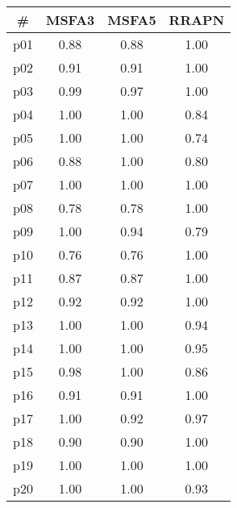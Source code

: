 \begin{tabular}{cccc}
\toprule
\textbf{\#} & \textbf{MSFA3} & \textbf{MSFA5} & \textbf{RRAPN}\\
\midrule
p01 & 0.88 & 0.88 & 1.00\\
p02 & 0.91 & 0.91 & 1.00\\
p03 & 0.99 & 0.97 & 1.00\\
p04 & 1.00 & 1.00 & 0.84\\
p05 & 1.00 & 1.00 & 0.74\\
p06 & 0.88 & 1.00 & 0.80\\
p07 & 1.00 & 1.00 & 1.00\\
p08 & 0.78 & 0.78 & 1.00\\
p09 & 1.00 & 0.94 & 0.79\\
p10 & 0.76 & 0.76 & 1.00\\
p11 & 0.87 & 0.87 & 1.00\\
p12 & 0.92 & 0.92 & 1.00\\
p13 & 1.00 & 1.00 & 0.94\\
p14 & 1.00 & 1.00 & 0.95\\
p15 & 0.98 & 1.00 & 0.86\\
p16 & 0.91 & 0.91 & 1.00\\
p17 & 1.00 & 0.92 & 0.97\\
p18 & 0.90 & 0.90 & 1.00\\
p19 & 1.00 & 1.00 & 1.00\\
p20 & 1.00 & 1.00 & 0.93\\
\bottomrule
\end{tabular}

